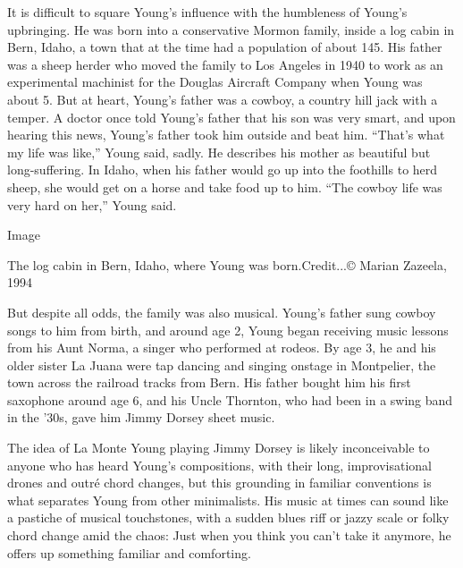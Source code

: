 It is difficult to square Young's influence with the humbleness of
Young's upbringing. He was born into a conservative Mormon family,
inside a log cabin in Bern, Idaho, a town that at the time had a
population of about 145. His father was a sheep herder who moved the
family to Los Angeles in 1940 to work as an experimental machinist for
the Douglas Aircraft Company when Young was about 5. But at heart,
Young's father was a cowboy, a country hill jack with a temper. A doctor
once told Young's father that his son was very smart, and upon hearing
this news, Young's father took him outside and beat him. ``That's what
my life was like,'' Young said, sadly. He describes his mother as
beautiful but long-suffering. In Idaho, when his father would go up into
the foothills to herd sheep, she would get on a horse and take food up
to him. ``The cowboy life was very hard on her,'' Young said.

Image

The log cabin in Bern, Idaho, where Young was born.Credit...© Marian
Zazeela, 1994

But despite all odds, the family was also musical. Young's father sung
cowboy songs to him from birth, and around age 2, Young began receiving
music lessons from his Aunt Norma, a singer who performed at rodeos. By
age 3, he and his older sister La Juana were tap dancing and singing
onstage in Montpelier, the town across the railroad tracks from Bern.
His father bought him his first saxophone around age 6, and his Uncle
Thornton, who had been in a swing band in the '30s, gave him Jimmy
Dorsey sheet music.

The idea of La Monte Young playing Jimmy Dorsey is likely inconceivable
to anyone who has heard Young's compositions, with their long,
improvisational drones and outré chord changes, but this grounding in
familiar conventions is what separates Young from other minimalists. His
music at times can sound like a pastiche of musical touchstones, with a
sudden blues riff or jazzy scale or folky chord change amid the chaos:
Just when you think you can't take it anymore, he offers up something
familiar and comforting.

